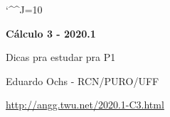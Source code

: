 \documentclass[oneside,12pt]{article}
\begin{document}
\catcode`\^^J=10


\long{}
\long{}
\long{}
\long{}
\long{}
\long{}
\long{}
\long{}
\long{}
\long{}

\long{}
\long{}

\def\frown{\ensuremath{{=}{(}}}
\def\True {\mathbf{V}}
\def\False{\mathbf{F}}

\def\drafturl{http://angg.twu.net/LATEX/2020-1-C2.pdf}
\def\drafturl{http://angg.twu.net/2020.1-C2.html}
\def\draftfooter{\tiny \href{\drafturl}{\jobname{}} \ColorBrown{\shorttoday{} \hours}}


%

\thispagestyle{empty}

\begin{center}

\vspace*{1.2cm}

{\bf \Large Cálculo 3 - 2020.1}

\bsk

Dicas pra estudar pra P1

\bsk

Eduardo Ochs - RCN/PURO/UFF

\url{http://angg.twu.net/2020.1-C3.html}

\end{center}

\newpage

\end{document}
